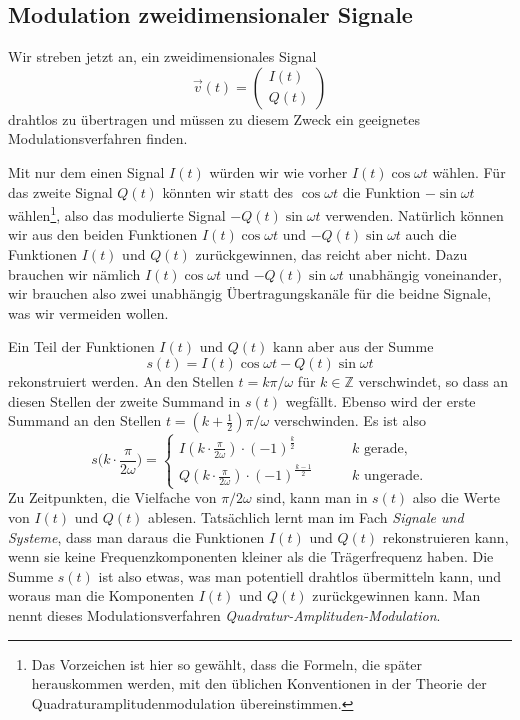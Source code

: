 %
%
%
\subsection{Modulation zweidimensionaler Signale
\label{subsection:modulation}}
Wir streben jetzt an, ein zweidimensionales Signal
\[
\vec{v}(t)
=
\begin{pmatrix}I(t)\\Q(t)\end{pmatrix}
\]
drahtlos zu übertragen und müssen zu diesem Zweck ein geeignetes
Modulationsverfahren finden.

Mit nur dem einen Signal $I(t)$ würden wir wie vorher $I(t)\cos\omega t$
wählen.
Für das zweite Signal $Q(t)$ könnten wir statt des $\cos\omega t$ die
Funktion $-\sin\omega t$ wählen\footnote{Das Vorzeichen ist hier so 
gewählt, dass die Formeln, die später herauskommen werden, mit den
üblichen Konventionen in der Theorie der Quadraturamplitudenmodulation
übereinstimmen.}, also das modulierte Signal
$-Q(t)\sin\omega t$ verwenden.
Natürlich können wir aus den beiden Funktionen $I(t)\cos\omega t$ und
$-Q(t)\sin\omega t$ auch die Funktionen $I(t)$ und $Q(t)$ zurückgewinnen,
das reicht aber nicht.
Dazu brauchen wir nämlich $I(t)\cos\omega t$ und $-Q(t)\sin\omega t$
unabhängig voneinander, wir brauchen also zwei unabhängig Übertragungskanäle
für die beidne Signale, was wir vermeiden wollen.

Ein Teil der Funktionen $I(t)$ und $Q(t)$ kann aber aus der Summe
\[
s(t)
=
I(t)\cos\omega t - Q(t)\sin\omega t
\]
rekonstruiert werden.
An den Stellen $t = k\pi/\omega$ für $k\in\mathbb Z$ verschwindet,
so dass an diesen Stellen der zweite Summand in $s(t)$ wegfällt.
Ebenso wird der erste Summand an den Stellen
$t = (k+\frac12)\pi/\omega$ verschwinden.
Es ist also
\[
s\biggl(k\cdot \frac{\pi}{2\omega}\biggr)
=
\begin{cases}
I(k\cdot \frac{\pi}{2\omega})\cdot(-1)^{\frac{k}2}
&\qquad \text{$k$ gerade,}\\[5pt]
Q(k\cdot \frac{\pi}{2\omega})\cdot(-1)^{\frac{k-1}2}
&\qquad \text{$k$ ungerade.}
\end{cases}
\]
Zu Zeitpunkten, die Vielfache von $\pi/2\omega$ sind, kann man in
$s(t)$ also die Werte von $I(t)$ und $Q(t)$ ablesen.
Tatsächlich lernt man im Fach {\em Signale und Systeme}, dass man daraus
die Funktionen $I(t)$ und $Q(t)$ rekonstruieren kann, wenn sie keine
Frequenzkomponenten kleiner als die Trägerfrequenz haben.
Die Summe $s(t)$ ist also etwas, was man potentiell drahtlos übermitteln
kann, und woraus man die Komponenten $I(t)$ und $Q(t)$ zurückgewinnen kann.
Man nennt dieses Modulationsverfahren {\em Quadratur-Amplituden-Modulation}.

